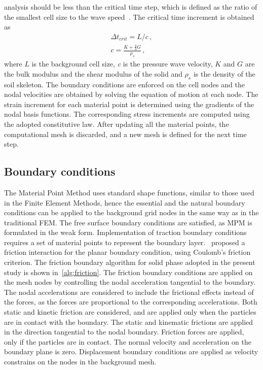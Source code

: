 analysis should be less than the critical time step, which is defined as the 
ratio of the smallest cell size to the wave speed~\citep{Chen2002}. The 
critical time increment is obtained as
%
\begin{align}
\Delta t_{crit} = L / c \,, \\
c = \frac{K+\frac{4}{3}G}{\rho_s} \,,
\end{align}
where $L$ is the background cell size, \textit{c} is the pressure wave 
velocity, $K$ and $G$ are the bulk modulus and the shear modulus of the solid 
and $\rho_s$ is the density of the soil skeleton. The boundary conditions are 
enforced on the cell nodes and the nodal velocities are obtained by solving the 
equation of motion at each node. The strain increment for each material point 
is determined using the gradients of the nodal basis functions. The 
corresponding stress increments are computed using the adopted constitutive 
law. After updating all the material points, the computational mesh is 
discarded, and a new mesh is defined for the next time step. 

\subsection{Boundary conditions}
The Material Point Method uses standard shape functions, similar to those used 
in the Finite Element Methods, hence the essential and the natural boundary 
conditions can be applied to the background grid nodes in the same way as in 
the traditional FEM. The free surface boundary conditions are satisfied, as MPM 
is formulated in the weak form. Implementation of traction boundary conditions 
requires a set of material points to represent the boundary 
layer.~\citet{Bandara2013} proposed a friction interaction for the planar 
boundary condition, using Coulomb's friction criterion. The friction boundary 
algorithm for solid phase adopted in the present study is shown 
in~\cref{alg:friction}. The friction boundary 
conditions are applied on the mesh nodes by controlling the nodal acceleration 
tangential to the boundary. The nodal accelerations 
are considered to include the frictional effects instead of the forces, as the 
forces are proportional to the corresponding accelerations. Both static and 
kinetic friction are considered, and are applied only when the particles 
are in contact with the boundary. The static and kinematic frictions are 
applied in the direction tangential to the nodal boundary. Friction 
forces are applied, only if the particles are in contact. The normal velocity 
and acceleration on the boundary plane is zero. Displacement boundary 
conditions are applied as velocity constrains on the nodes in the background 
mesh.

